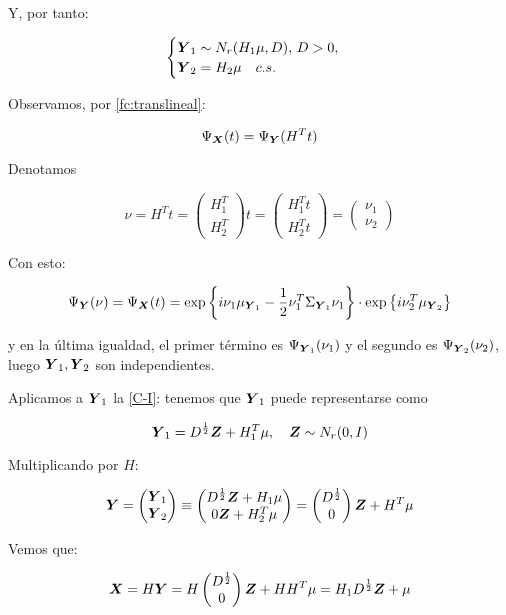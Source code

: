 Y, por tanto:

\[
\begin{cases} \boldsymbol{Y}_1 \sim N_r(H_1\mu,D),\, D> 0, \\ \boldsymbol{Y}_2 = H_2\mu \quad c.s. \end{cases}
\]

Observamos, por \ref{fc:translineal}:

\[
\Psi_{\boldsymbol{X}}(t) = \Psi_{\boldsymbol{Y}}(H^T t)
\]

Denotamos

\[
\nu = H^T t = \begin{pmatrix} H_1^T \\ H_2^T\end{pmatrix}t = \begin{pmatrix} H_1^Tt \\ H_2^Tt\end{pmatrix} = \begin{pmatrix} \nu_1 \\ \nu_2\end{pmatrix}
\]

Con esto:

\[
\Psi_{\boldsymbol{Y}}(\nu) = \Psi_{\boldsymbol{X}}(t) = \exp\left\{ i\nu_1\mu_{\boldsymbol{Y}_1} - \frac{1}{2} \nu_1^T \Sigma_{\boldsymbol{Y}_1}\nu_1 \right\} \cdot \exp\left\{i\nu_2^T \mu_{\boldsymbol{Y}_2}\right\}
\]

y en la última igualdad, el primer término es $\Psi_{\boldsymbol{Y}_1}(\nu_1)$ y el segundo es $\Psi_{\boldsymbol{Y}_2}(\nu_2)$, luego $\boldsymbol{Y}_1,\boldsymbol{Y}_2$ son independientes.

Aplicamos a $\boldsymbol{Y}_1$ la \hyperref[posvar:car-i]{[C-I]}: tenemos que $\boldsymbol{Y}_1$ puede representarse como

\[
\boldsymbol{Y}_1 = D^{\frac{1}{2}}\boldsymbol{Z} + H_1^T \mu, \quad \boldsymbol{Z} \sim N_r(0,I) 
\]

Multiplicando por $H$:

\[
\boldsymbol{Y} = \begin{pmatrix} \boldsymbol{Y}_1 \\ \boldsymbol{Y}_2 \end{pmatrix} \equiv \begin{pmatrix} D^{\frac{1}{2}} \boldsymbol{Z} + H_1\mu \\ 0\boldsymbol{Z}+ H_2^T \mu\end{pmatrix} = \begin{pmatrix} D^{\frac{1}{2}} \\ 0 \end{pmatrix}\boldsymbol{Z} + H^T \mu
\]

Vemos que:

\[
\boldsymbol{X} = H\boldsymbol{Y} = H\begin{pmatrix} D^{\frac{1}{2}} \\ 0\end{pmatrix} \boldsymbol{Z} + HH^T\mu = H_1D^{\frac{1}{2}}\boldsymbol{Z} + \mu
\]

